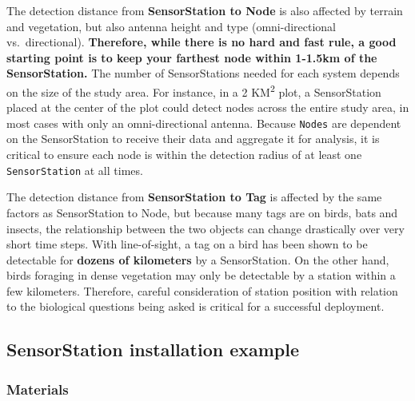 \documentclass[
]{article}
\begin{document}
The detection distance from \textbf{SensorStation to Node} is also
affected by terrain and vegetation, but also antenna height and type
(omni-directional vs.~directional). \textbf{Therefore, while there is no
hard and fast rule, a good starting point is to keep your farthest node
within 1-1.5km of the SensorStation.} The number of SensorStations
needed for each system depends on the size of the study area. For
instance, in a 2 KM\textsuperscript{2} plot, a SensorStation placed at
the center of the plot could detect nodes across the entire study area,
in most cases with only an omni-directional antenna. Because
\texttt{Nodes} are dependent on the SensorStation to receive their data
and aggregate it for analysis, it is critical to ensure each node is
within the detection radius of at least one \texttt{SensorStation} at
all times.

The detection distance from \textbf{SensorStation to Tag} is affected by
the same factors as SensorStation to Node, but because many tags are on
birds, bats and insects, the relationship between the two objects can
change drastically over very short time steps. With line-of-sight, a tag
on a bird has been shown to be detectable for \textbf{dozens of
kilometers} by a SensorStation. On the other hand, birds foraging in
dense vegetation may only be detectable by a station within a few
kilometers. Therefore, careful consideration of station position with
relation to the biological questions being asked is critical for a
successful deployment.

\hypertarget{sensorstation-installation-example}{%
\subsection{SensorStation installation
example}\label{sensorstation-installation-example}}

\hypertarget{materials}{%
\subsubsection{Materials}\label{materials}}
\end{document}
